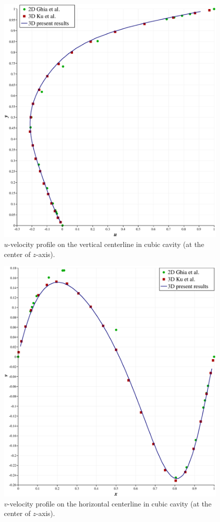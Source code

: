 \documentclass[12pt,a4paper,fleqn]{article}
\begin{document}
\begin{figure}[H]
    \centering
    \includegraphics[width=\linewidth]{U-3D_vs_Ku-3D.eps}
    \caption{\(u\)-velocity profile on the vertical centerline in cubic cavity (at the center of \(z\)-axis).}
\end{figure}

\begin{figure}[H]
    \centering
    \includegraphics[width=\linewidth]{V-3D_vs_Ku-3D.eps}
    \caption{\(v\)-velocity profile on the horizontal centerline in cubic cavity (at the center of \(z\)-axis).}
\end{figure}
\end{document}

